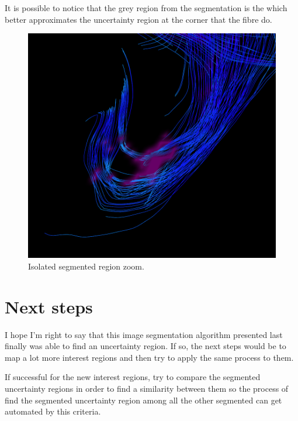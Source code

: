 \documentclass[a4paper,11pt]{report}
\begin{document}
  It is possible to notice that the grey region from the segmentation is the which better approximates the uncertainty region at the corner that the fibre do.

  \begin{figure}[H]
    \centering
    \includegraphics[width=0.6\linewidth]{imgs/cc-expanded-fibers-mask-croped-watersheds-region7-zoomed.png}
    \caption{Isolated segmented region zoom.}
    \label{fig:fibres-mask-croped-segmented-region}
  \end{figure}

\chapter{Next steps}
I hope I'm right to say that this image segmentation algorithm presented last finally was able to find an uncertainty region. If so, the next steps would be to map a lot more interest regions and then try to apply the same process to them.

If successful for the new interest regions, try to compare the segmented uncertainty regions in order to find a similarity between them so the process of find the segmented uncertainty region among all the other segmented can get automated by this criteria.
\end{document}

